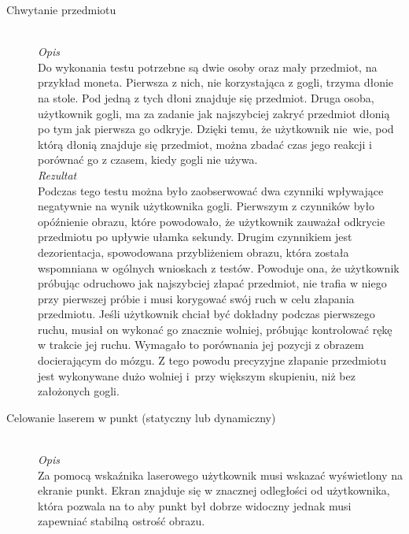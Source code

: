 \documentclass[a4paper,11pt,twoside]{report}
\theoremstyle{definition}
\begin{document}
\begin{description}
\item[Chwytanie przedmiotu] \hfill \\
\textit{Opis} \\
Do wykonania testu potrzebne są dwie osoby oraz mały przedmiot, na przykład moneta. Pierwsza z nich, nie korzystająca z gogli, trzyma dłonie na stole. Pod jedną z tych dłoni znajduje się przedmiot. Druga osoba, użytkownik gogli, ma za zadanie jak najszybciej zakryć przedmiot dłonią po tym jak pierwsza go odkryje. Dzięki temu, że użytkownik nie~wie, pod którą dłonią znajduje się przedmiot, można zbadać czas jego reakcji i porównać go z czasem, kiedy gogli nie używa. \\

\textit{Rezultat} \\
Podczas tego testu można było zaobserwować dwa czynniki wpływające negatywnie na wynik użytkownika gogli. Pierwszym z czynników było opóźnienie obrazu, które powodowało, że użytkownik zauważał odkrycie przedmiotu po upływie ułamka sekundy. Drugim czynnikiem jest dezorientacja, spowodowana przybliżeniem obrazu, która została wspomniana w ogólnych wnioskach z testów. Powoduje ona, że użytkownik próbując odruchowo jak najszybciej złapać przedmiot, nie trafia w niego przy pierwszej próbie i musi korygować swój ruch w celu złapania przedmiotu. Jeśli użytkownik chciał być dokładny podczas pierwszego ruchu, musiał on wykonać go znacznie wolniej, próbując kontrolować rękę w trakcie jej ruchu. Wymagało to porównania jej pozycji z obrazem docierającym do mózgu. Z tego powodu precyzyjne złapanie przedmiotu jest wykonywane dużo wolniej i~przy większym skupieniu, niż bez założonych gogli.

\item[Celowanie laserem w punkt (statyczny lub dynamiczny)] \hfill \\
\textit{Opis} \\
Za pomocą wskaźnika laserowego użytkownik musi wskazać wyświetlony na ekranie punkt. Ekran znajduje się w znacznej odległości od użytkownika, która pozwala na to aby punkt był dobrze widoczny jednak musi zapewniać stabilną ostrość obrazu.


\end{description}
\end{document}
